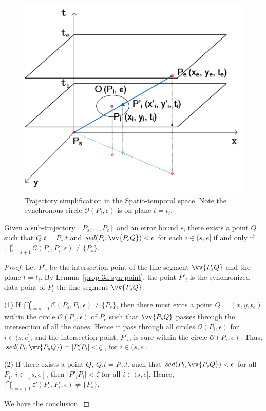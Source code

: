 \begin{figure}[tb!]
\centering
\includegraphics[scale=0.56]{figures/Fig-SEDin3D.png}
\vspace{-1ex}
\caption{\small Trajectory simplification in the Spatio-temporal space. Note the synchronous circle $\mathcal{O}(P_i, \epsilon)$ is on plane $t=t_i$.} %
\vspace{-3ex}
\label{fig:sed3d}
\end{figure}



\begin{theorem}
\label{prop-3d-ci}
Given a sub-trajectory $[P_s,...,P_e]$ and an error bound $\epsilon$, there exists a point $Q$ such that $Q.t = P_e.t$ and $sed(P_i, \vv{P_sQ})<\epsilon$ for each $i \in (s,e]$ if and only if $\bigsqcap_{i=s+1}^{e}{\mathcal{C}(P_s, P_i, \epsilon)} \ne \{P_s\}$.
\end{theorem}

\begin{proof}
Let $P'_i$ be the intersection point of the line segment $\vv{P_sQ}$ and the plane $t=t_i$.
By Lemma~\ref{prop-3d-syn-point}, the point $P'_i$ is the synchronized data point of $P_i$ \wrt the line segment $\vv{P_sQ}$.

\ni (1) If $\bigcap_{i=s+1}^{e}{\mathcal{C}(P_s, P_i, \epsilon)} \ne \{P_s\}$, then there must exits a point $Q = (x,y,t_e)$ within the circle $\mathcal{O}(P_e, \epsilon)$ of $P_e$ such that $\vv{P_sQ}$ passes through the intersection of all the cones. Hence it pass through all circles $\mathcal{O}(P_i, \epsilon)$ for $i \in (s, e]$, and the intersection point, $P'_i$, is sure within the circle $\mathcal{O}(P_i, \epsilon)$. Thus, $sed(P_i, \vv{P_sQ}) = |P'_iP_i| < \zeta$, for $i \in (s, e]$.

\ni (2) If there exists a point $Q$, $Q.t = P_e.t$, such that $sed(P_i, \vv{P_sQ})<\epsilon$ for all $P_i$, $i \in [s,e]$, then $|P'_iP_i| < \zeta$ for all $i \in (s, e]$. Hence, $\bigcap_{i=s+1}^{e}{\mathcal{C}(P_s, P_i, \epsilon)} \ne \{P_s\}$.

We have the conclusion.
\end{proof}


